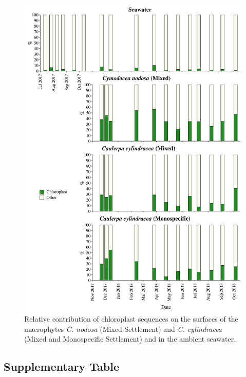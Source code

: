 \documentclass[12pt,]{article}
\begin{document}
\begin{figure}[H]

{\centering \includegraphics[width=0.85\linewidth]{../results/figures/chloroplast_bar_plot} 

}

\caption{Relative contribution of chloroplast sequences on the surfaces of the macrophytes \textit{C. nodosa} (Mixed Settlement) and \textit{C. cylindracea} (Mixed and Monospecific Settlement) and in the ambient seawater.\label{chloroplast}}\label{fig:unnamed-chunk-3}
\end{figure}

\hypertarget{supplementary-table}{%
\subsection{Supplementary Table}\label{supplementary-table}}

\begingroup\fontsize{9}{11}\selectfont
\end{document}
